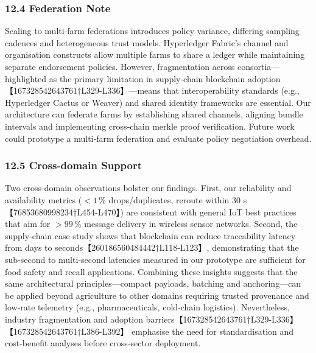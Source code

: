 \subsubsection*{12.4 Federation Note}
Scaling to multi‑farm federations introduces policy variance, differing sampling cadences and heterogeneous trust models.  Hyperledger Fabric’s channel and organisation constructs allow multiple farms to share a ledger while maintaining separate endorsement policies.  However, fragmentation across consortia—highlighted as the primary limitation in supply‑chain blockchain adoption【167328542643761†L329-L336】—means that interoperability standards (e.g., Hyperledger Cactus or Weaver) and shared identity frameworks are essential.  Our architecture can federate farms by establishing shared channels, aligning bundle intervals and implementing cross‑chain merkle proof verification.  Future work could prototype a multi‑farm federation and evaluate policy negotiation overhead.

\subsubsection*{12.5 Cross‑domain Support}
Two cross‑domain observations bolster our findings.  First, our reliability and availability metrics (\(<1\,\%\) drops/duplicates, reroute within 30 s【76853680998234†L454-L470】) are consistent with general IoT best practices that aim for \(>99\,\%\) message delivery in wireless sensor networks.  Second, the supply‑chain case study shows that blockchain can reduce traceability latency from days to seconds【260186560484442†L118-L123】, demonstrating that the sub‑second to multi‑second latencies measured in our prototype are sufficient for food safety and recall applications.  Combining these insights suggests that the same architectural principles—compact payloads, batching and anchoring—can be applied beyond agriculture to other domains requiring trusted provenance and low‑rate telemetry (e.g., pharmaceuticals, cold‑chain logistics).  Nevertheless, industry fragmentation and adoption barriers【167328542643761†L329-L336】【167328542643761†L386-L392】 emphasise the need for standardisation and cost‑benefit analyses before cross‑sector deployment.


